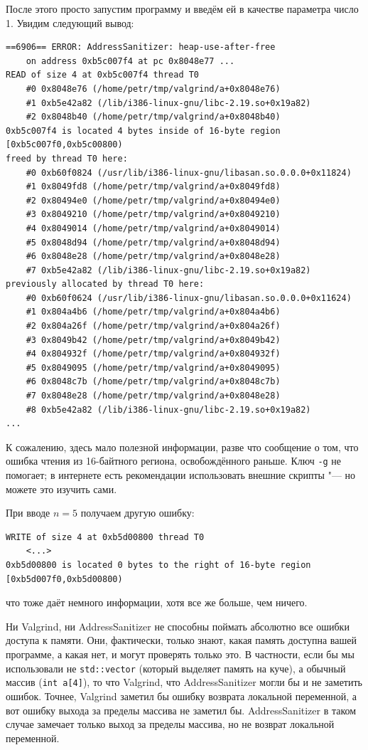 \documentclass[a4paper,10pt]{problems}
\begin{document}
После этого просто запустим программу и введём ей в качестве параметра число 1. Увидим следующий вывод:
\begin{verbatim}
==6906== ERROR: AddressSanitizer: heap-use-after-free 
    on address 0xb5c007f4 at pc 0x8048e77 ...
READ of size 4 at 0xb5c007f4 thread T0
    #0 0x8048e76 (/home/petr/tmp/valgrind/a+0x8048e76)
    #1 0xb5e42a82 (/lib/i386-linux-gnu/libc-2.19.so+0x19a82)
    #2 0x8048b40 (/home/petr/tmp/valgrind/a+0x8048b40)
0xb5c007f4 is located 4 bytes inside of 16-byte region [0xb5c007f0,0xb5c00800)
freed by thread T0 here:
    #0 0xb60f0824 (/usr/lib/i386-linux-gnu/libasan.so.0.0.0+0x11824)
    #1 0x8049fd8 (/home/petr/tmp/valgrind/a+0x8049fd8)
    #2 0x80494e0 (/home/petr/tmp/valgrind/a+0x80494e0)
    #3 0x8049210 (/home/petr/tmp/valgrind/a+0x8049210)
    #4 0x8049014 (/home/petr/tmp/valgrind/a+0x8049014)
    #5 0x8048d94 (/home/petr/tmp/valgrind/a+0x8048d94)
    #6 0x8048e28 (/home/petr/tmp/valgrind/a+0x8048e28)
    #7 0xb5e42a82 (/lib/i386-linux-gnu/libc-2.19.so+0x19a82)
previously allocated by thread T0 here:
    #0 0xb60f0624 (/usr/lib/i386-linux-gnu/libasan.so.0.0.0+0x11624)
    #1 0x804a4b6 (/home/petr/tmp/valgrind/a+0x804a4b6)
    #2 0x804a26f (/home/petr/tmp/valgrind/a+0x804a26f)
    #3 0x8049b42 (/home/petr/tmp/valgrind/a+0x8049b42)
    #4 0x804932f (/home/petr/tmp/valgrind/a+0x804932f)
    #5 0x8049095 (/home/petr/tmp/valgrind/a+0x8049095)
    #6 0x8048c7b (/home/petr/tmp/valgrind/a+0x8048c7b)
    #7 0x8048e28 (/home/petr/tmp/valgrind/a+0x8048e28)
    #8 0xb5e42a82 (/lib/i386-linux-gnu/libc-2.19.so+0x19a82)
...
\end{verbatim}
К сожалению, здесь мало полезной информации, разве что сообщение о том, что ошибка чтения из 16-байтного региона, освобождённого раньше.
Ключ \verb`-g` не помогает; в интернете есть рекомендации использовать внешние скрипты "--- но можете это изучить сами.

При вводе $n=5$ получаем другую ошибку:
\begin{verbatim}
WRITE of size 4 at 0xb5d00800 thread T0
    <...>
0xb5d00800 is located 0 bytes to the right of 16-byte region [0xb5d007f0,0xb5d00800)
\end{verbatim}
что тоже даёт немного информации, хотя все же больше, чем ничего.

Ни Valgrind, ни AddressSanitizer не способны поймать абсолютно все ошибки доступа к памяти. 
Они, фактически, только знают, какая память доступна вашей программе, а какая нет, и могут проверять только это.
В частности, если бы мы использовали не \verb`std::vector` (который выделяет память на куче), а обычный массив (\verb`int a[4]`), 
то что Valgrind, что AddressSanitizer могли бы и не заметить ошибок. 
Точнее, Valgrind заметил бы ошибку возврата локальной переменной, а вот ошибку выхода за пределы массива не заметил бы.
AddressSanitizer в таком случае замечает только выход за пределы массива, но не возврат локальной переменной.
\end{document}
